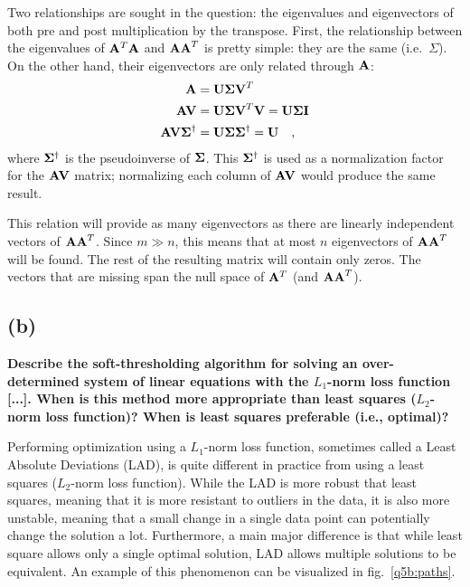 \documentclass{report}
\begin{document}
Two relationships are sought in the question: the eigenvalues and eigenvectors of both pre and post multiplication by the transpose. First, the relationship between the eigenvalues of $\mathbf{A}^T\mathbf{A}$ and $\mathbf{AA}^T$ is pretty simple: they are the same (i.e.\ $\Sigma$). On the other hand, their eigenvectors are only related through $\mathbf{A}$:
\begin{align*}
\mathbf{A}  &= \mathbf{U \Sigma V}^T \\
\mathbf{AV} &= \mathbf{U \Sigma V}^T \mathbf{V} = \mathbf{U \Sigma I} \\
\mathbf{AV\Sigma}^\dagger &= \mathbf{U \Sigma \Sigma}^\dagger = \mathbf{U} \quad,
\end{align*}
where $\mathbf{\Sigma}^\dagger$ is the pseudoinverse of $\mathbf{\Sigma}$. This $\mathbf{\Sigma}^\dagger$ is used as a normalization factor for the $\mathbf{AV}$ matrix; normalizing each column of $\mathbf{AV}$ would produce the same result.

This relation will provide as many eigenvectors as there are linearly independent vectors of $\mathbf{AA}^T$. Since $m \gg n$, this means that at most $n$ eigenvectors of $\mathbf{AA}^T$ will be found. The rest of the resulting matrix will contain only zeros. The vectors that are missing span the null space of $\mathbf{A}^T$ (and $\mathbf{AA}^T$).

\subsection{(b)}
\textbf{Describe the soft-thresholding algorithm for solving  an over-determined system of linear equations with the $L_1$-norm loss function [...]. When is this method more appropriate than least squares ($L_2$-norm loss function)? When is least squares preferable (i.e., optimal)?}

Performing optimization using a $L_1$-norm loss function, sometimes called a Least Absolute Deviations (LAD), is quite different in practice from using a least squares ($L_2$-norm loss function). While the LAD is more robust that least squares, meaning that it is more resistant to outliers in the data, it is also more unstable, meaning that a small change in a single data point can potentially change the solution a lot. Furthermore, a main major difference is that while least square allows only a single optimal solution, LAD allows multiple solutions to be equivalent. An example of this phenomenon can be visualized in fig.~\ref{q5b:paths}.
\end{document}
